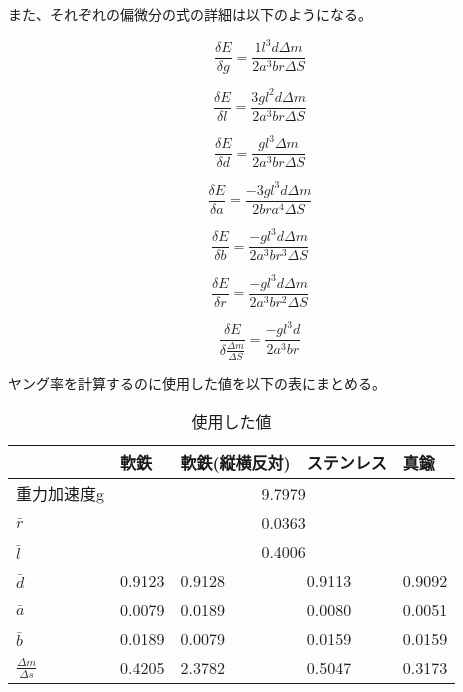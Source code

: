 \documentclass{jsarticle}
\begin{document}
また、それぞれの偏微分の式の詳細は以下のようになる。

\begin{equation}
    \frac{\delta E}{\delta g} = \frac{1l^3d\Delta m}{2a^3br\Delta S}
\end{equation}

\begin{equation}
    \frac{\delta E}{\delta l} = \frac{3gl^2d\Delta m}{2a^3br\Delta S}
\end{equation}

\begin{equation}
    \frac{\delta E}{\delta d} = \frac{gl^3\Delta m}{2a^3br\Delta S}
\end{equation}

\begin{equation}
    \frac{\delta E}{\delta a} = \frac{-3gl^3d\Delta m}{2bra^4\Delta S}
\end{equation}

\begin{equation}
    \frac{\delta E}{\delta b} = \frac{-gl^3d\Delta m}{2a^3br^3\Delta S}
\end{equation}

\begin{equation}
    \frac{\delta E}{\delta r} = \frac{-gl^3d\Delta m}{2a^3br^2\Delta S}
\end{equation}

\begin{equation}
    \frac{\delta E}{ \delta\frac{\Delta m}{\Delta S}} = \frac{-gl^3d}{2a^3br}
\end{equation}

ヤング率を計算するのに使用した値を以下の表にまとめる。

\begin{table}[H]
    \centering
    \caption{使用した値}
    \label{my-label}
    \begin{tabular}{|l|l|l|l|l|}
    \hline
              & 軟鉄     & 軟鉄(縦横反対) & ステンレス  & 真鍮     \\ \hline
    重力加速度g    & \multicolumn{4}{c|}{9.7979}         \\ \hline
    $\bar r $     & \multicolumn{4}{c|}{0.0363}         \\ \hline
    $\bar l $     & \multicolumn{4}{c|}{0.4006}         \\ \hline
    $\bar d $ & 0.9123 & 0.9128   & 0.9113 & 0.9092 \\ \hline
    $\bar a $     & 0.0079 & 0.0189   & 0.0080 & 0.0051 \\ \hline
    $\bar b $     & 0.0189 & 0.0079   & 0.0159 & 0.0159 \\ \hline
    $\frac{\Delta m}{\Delta s}$     & 0.4205 & 2.3782   & 0.5047 & 0.3173 \\ \hline
    \end{tabular}
    \end{table}
\end{document}
